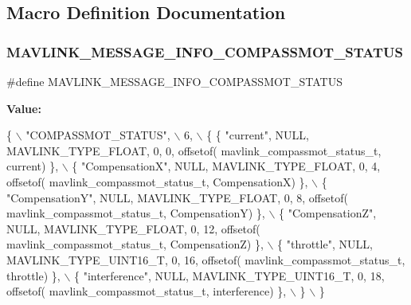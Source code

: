\subsection{Macro Definition Documentation}
\mbox{\label{mavlink__msg__compassmot__status_8h_a3e7b1e608996d00ada122c3828f39812}} 
\subsubsection{M\+A\+V\+L\+I\+N\+K\+\_\+\+M\+E\+S\+S\+A\+G\+E\+\_\+\+I\+N\+F\+O\+\_\+\+C\+O\+M\+P\+A\+S\+S\+M\+O\+T\+\_\+\+S\+T\+A\+T\+US}
{\footnotesize\ttfamily \#define M\+A\+V\+L\+I\+N\+K\+\_\+\+M\+E\+S\+S\+A\+G\+E\+\_\+\+I\+N\+F\+O\+\_\+\+C\+O\+M\+P\+A\+S\+S\+M\+O\+T\+\_\+\+S\+T\+A\+T\+US}

{\bfseries Value\+:}
\begin{DoxyCode}
\{ \(\backslash\)
    \textcolor{stringliteral}{"COMPASSMOT\_STATUS"}, \(\backslash\)
    6, \(\backslash\)
    \{  \{ \textcolor{stringliteral}{"current"}, NULL, MAVLINK_TYPE_FLOAT, 0, 0, offsetof(
      mavlink_compassmot_status_t, current) \}, \(\backslash\)
         \{ \textcolor{stringliteral}{"CompensationX"}, NULL, MAVLINK_TYPE_FLOAT, 0, 4, offsetof(
      mavlink_compassmot_status_t, CompensationX) \}, \(\backslash\)
         \{ \textcolor{stringliteral}{"CompensationY"}, NULL, MAVLINK_TYPE_FLOAT, 0, 8, offsetof(
      mavlink_compassmot_status_t, CompensationY) \}, \(\backslash\)
         \{ \textcolor{stringliteral}{"CompensationZ"}, NULL, MAVLINK_TYPE_FLOAT, 0, 12, offsetof(
      mavlink_compassmot_status_t, CompensationZ) \}, \(\backslash\)
         \{ \textcolor{stringliteral}{"throttle"}, NULL, MAVLINK_TYPE_UINT16_T, 0, 16, offsetof(
      mavlink_compassmot_status_t, throttle) \}, \(\backslash\)
         \{ \textcolor{stringliteral}{"interference"}, NULL, MAVLINK_TYPE_UINT16_T, 0, 18, offsetof(
      mavlink_compassmot_status_t, interference) \}, \(\backslash\)
         \} \(\backslash\)
\}
\end{DoxyCode}
\mbox{\label{mavlink__msg__compassmot__status_8h_aea56d20f82a175d19fe751b7da5ac99f}} 
